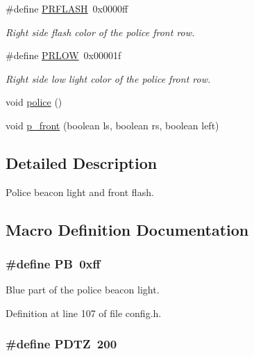 \begin{DoxyCompactItemize}
\#define \hyperlink{group__police_gac9d0142b6f8cc7735af13e6b91503b97}{P\+R\+F\+L\+A\+SH}~0x0000ff
\begin{DoxyCompactList}\small\item\em Right side flash color of the police front row. \end{DoxyCompactList}\item 
\#define \hyperlink{group__police_gaf4a707e896c2e6df7a0215e4100d75aa}{P\+R\+L\+OW}~0x00001f
\begin{DoxyCompactList}\small\item\em Right side low light color of the police front row. \end{DoxyCompactList}\end{DoxyCompactItemize}
\begin{DoxyCompactItemize}
\item 
void \hyperlink{group__police_ga55d627c45708bc26866e27d49432eee9}{police} ()
\item 
void \hyperlink{group__police_ga82542db5e1a84d584a1725f36caaf71e}{p\+\_\+front} (boolean ls, boolean rs, boolean left)
\end{DoxyCompactItemize}


\subsection{Detailed Description}
Police beacon light and front flash. 



\subsection{Macro Definition Documentation}
\subsubsection[{\texorpdfstring{PB}{PB}}]{\setlength{\rightskip}{0pt plus 5cm}\#define PB~0xff}\hypertarget{group__police_ga2a06f3773d46878dc58f8dadd6fd0d72}{}\label{group__police_ga2a06f3773d46878dc58f8dadd6fd0d72}


Blue part of the police beacon light. 



Definition at line 107 of file config.\+h.

\subsubsection[{\texorpdfstring{P\+D\+TZ}{PDTZ}}]{\setlength{\rightskip}{0pt plus 5cm}\#define P\+D\+TZ~200}\hypertarget{group__police_ga2b9a2b71c1aa4f1c059461e2db7edf44}{}\label{group__police_ga2b9a2b71c1aa4f1c059461e2db7edf44}


